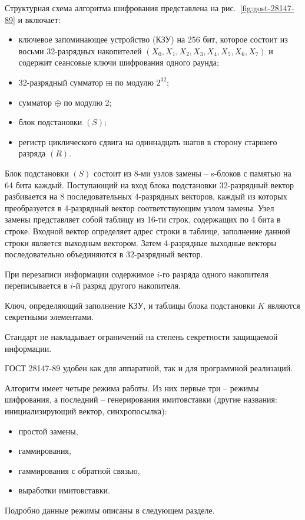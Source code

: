 Структурная схема алгоритма шифрования представлена на рис.~\ref{fig:gost-28147-89} и включает:
\begin{itemize}
    \item ключевое запоминающее устройство (КЗУ) на 256 бит, которое состоит из восьми 32-разрядных накопителей $(X_0, X_1, X_2, X_3, X_4, X_5, X_6, X_7)$ и содержит сеансовые ключи шифрования одного раунда;
    \item 32-разрядный сумматор $\boxplus$ по модулю $2^{32}$;
    \item сумматор $\oplus$ по модулю 2;
    \item блок подстановки $(S)$;
    \item регистр циклического сдвига на одиннадцать шагов в сторону старшего разряда $(R)$.
\end{itemize}

Блок подстановки $(S)$ состоит из 8-ми узлов замены -- s-блоков с памятью на 64 бита каждый. Поступающий на вход блока подстановки 32-разрядный вектор разбивается на 8 последовательных 4-разрядных векторов, каждый из которых преобразуется в 4-разрядный вектор соответствующим узлом замены. Узел замены представляет собой таблицу из 16-ти строк, содержащих по 4 бита в строке. Входной вектор определяет адрес строки в таблице, заполнение данной строки является выходным вектором. Затем 4-разрядные выходные векторы последовательно объединяются в 32-разрядный вектор.

При перезаписи информации содержимое $i$-го разряда одного накопителя переписывается в $i$-й разряд другого накопителя.

Ключ, определяющий заполнение КЗУ, и таблицы блока подстановки $K$ являются секретными элементами.

Стандарт не накладывает ограничений на степень секретности защищаемой информации.

ГОСТ 28147-89 удобен как для аппаратной, так и для программной реализаций.

Алгоритм имеет четыре режима работы. Из них первые три -- режимы шифрования, а последний -- генерирования имитовставки (другие названия: инициализирующий вектор, синхропосылка):
\begin{itemize}
    \item простой замены,
    \item гаммирования,
    \item гаммирования с обратной связью,
    \item выработки имитовставки.
\end{itemize}


Подробно данные режимы описаны в следующем разделе.

